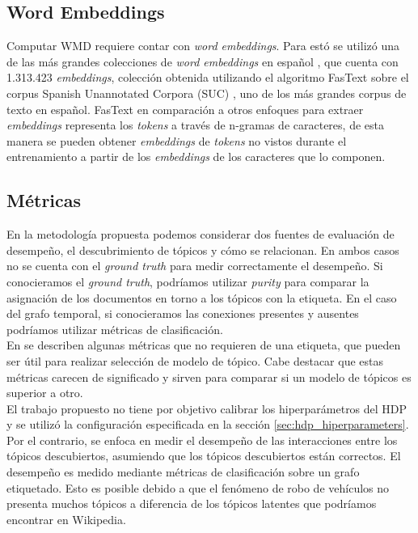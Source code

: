 \subsection{Word Embeddings}

Computar WMD requiere contar con \textit{word embeddings}. Para estó se utilizó una de las más grandes colecciones de \textit{word embeddings} en español \citep{fastextSUC}, que cuenta con 1.313.423 \textit{embeddings}, colección obtenida utilizando el algoritmo FasText \citep{bojanowski2017enriching} sobre el corpus Spanish Unannotated Corpora (SUC) \citep{josecanneteSUC}, uno de los más grandes corpus de texto en español. FasText en comparación a otros enfoques para extraer \textit{embeddings} representa los \textit{tokens} a través de n-gramas de caracteres, de esta manera se pueden obtener \textit{embeddings} de \textit{tokens} no vistos durante el entrenamiento a partir de los \textit{embeddings} de los caracteres que lo componen.

\subsection{Métricas}

En la metodología propuesta podemos considerar dos fuentes de evaluación de desempeño, el descubrimiento de tópicos y cómo se relacionan. En ambos casos no se cuenta con el \textit{ground truth} para medir correctamente el desempeño. Si conocieramos el \textit{ground truth}, podríamos utilizar \textit{purity} \citep{manning2008introduction} para comparar la asignación de los documentos en torno a los tópicos con la etiqueta. En el caso del grafo temporal, si conocieramos las conexiones presentes y ausentes podríamos utilizar métricas de clasificación.\\

En \citep{blei2003latent,griffiths2004finding,cao2009density,arun2010finding,deveaud2014accurate,zhang2017lda} se describen algunas métricas que no requieren de una etiqueta, que pueden ser útil para realizar selección de modelo de tópico. Cabe destacar que estas métricas carecen de significado y sirven para comparar si un modelo de tópicos es superior a otro.\\

El trabajo propuesto no tiene por objetivo calibrar los hiperparámetros del HDP y se utilizó la configuración especificada en la sección \ref{sec:hdp_hiperparameters}. Por el contrario, se enfoca en medir el desempeño de las interacciones entre los tópicos descubiertos, asumiendo que los tópicos descubiertos están correctos. El desempeño es medido mediante métricas de clasificación sobre un grafo etiquetado. Esto es posible  debido a que el fenómeno de robo de vehículos no presenta muchos tópicos a diferencia de los tópicos latentes que podríamos encontrar en Wikipedia.\\


